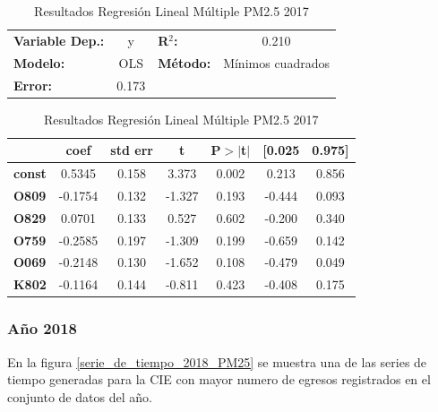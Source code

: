 \begin{table}[hbt!]
\caption{Resultados Regresión Lineal Múltiple PM2.5 2017}
\label{tab:RRLM PM2.5 2017}
\begin{center}
\begin{tabular}{lclc}
\toprule
\textbf{Variable Dep.:}    &        y         & \textbf{  R$^2$:         } &     0.210   \\
\textbf{Modelo:}            &       OLS        & \textbf{Método:}           &  Mínimos cuadrados   \\
\textbf{Error:}            & 0.173  \\
\bottomrule
\end{tabular}
\begin{tabular}{lcccccc}
               & \textbf{coef} & \textbf{std err} & \textbf{t} & \textbf{P$> |$t$|$} & \textbf{[0.025} & \textbf{0.975]}  \\
\midrule
\textbf{const} &       0.5345  &        0.158     &     3.373  &         0.002        &        0.213    &        0.856     \\
\textbf{O809}  &      -0.1754  &        0.132     &    -1.327  &         0.193        &       -0.444    &        0.093     \\
\textbf{O829}  &       0.0701  &        0.133     &     0.527  &         0.602        &       -0.200    &        0.340     \\
\textbf{O759}  &      -0.2585  &        0.197     &    -1.309  &         0.199        &       -0.659    &        0.142     \\
\textbf{O069}  &      -0.2148  &        0.130     &    -1.652  &         0.108        &       -0.479    &        0.049     \\
\textbf{K802}  &      -0.1164  &        0.144     &    -0.811  &         0.423        &       -0.408    &        0.175     \\
\bottomrule
\end{tabular}
\end{center}
\end{table}

\subsubsection{Año 2018}
En la figura \ref{serie_de_tiempo_2018_PM25} se muestra una de las series de tiempo generadas para la CIE \citep{r9} con mayor numero de egresos registrados en el conjunto de datos del año.

